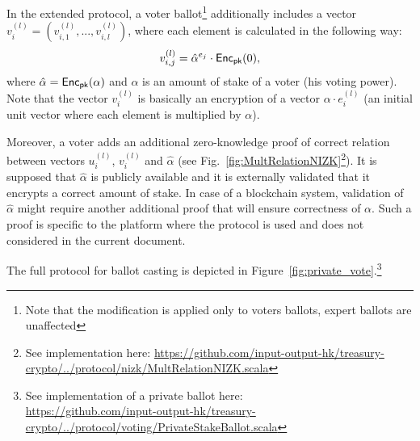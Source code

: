 In the extended protocol, a voter ballot\footnote{Note that the modification is applied only to voters ballots, expert ballots are unaffected} additionally includes a vector $v^{(l)}_i=(v^{(l)}_{i,1},...,v^{(l)}_{i,l})$, where each element is calculated in the following way:
\[v^{(l)}_{i,j}=\hat{\alpha}^{e_j}\cdot\mathsf{Enc}_{\mathsf{pk}}(0), \]
where $\hat{\alpha}=\mathsf{Enc}_{\mathsf{pk}}(\alpha)$ and $\alpha$ is an amount of stake of a voter (his voting power). Note that the vector $v^{(l)}_i$ is basically an encryption of a vector $\alpha \cdot e^{(l)}_i$ (an initial unit vector where each element is multiplied by $\alpha$).

Moreover, a voter adds an additional zero-knowledge proof of correct relation between vectors $u^{(l)}_i$, $v^{(l)}_i$ and $\hat\alpha$ (see Fig.~\ref{fig:MultRelationNIZK}\footnote{See implementation here: \href{https://github.com/input-output-hk/treasury-crypto/blob/new_api/src/main/scala/io/iohk/protocol/nizk/MultRelationNIZK.scala}{https://github.com/input-output-hk/treasury-crypto/../protocol/nizk/MultRelationNIZK.scala}}). It is supposed that $\hat\alpha$ is publicly available and it is externally validated that it encrypts  a correct amount of stake. In case of a blockchain system, validation of $\hat\alpha$ might require another additional proof that will ensure correctness of $\alpha$. Such a proof is specific to the platform where the protocol is used and does not considered in the current document.

The full protocol for ballot casting is depicted in Figure~\ref{fig:private_vote}.\footnote{See implementation of a private ballot here:\\ \href{https://github.com/input-output-hk/treasury-crypto/blob/new_api/src/main/scala/io/iohk/protocol/voting/PrivateStakeBallot.scala}{https://github.com/input-output-hk/treasury-crypto/../protocol/voting/PrivateStakeBallot.scala}}

